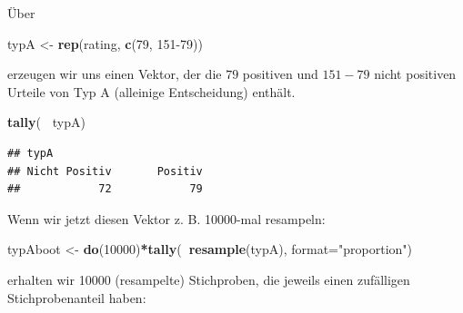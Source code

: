 \documentclass[12pt,ngerman,paper=a4,pagesize,DIV=13]{scrreprt}
\newenvironment{Shaded}{\begin{snugshade}}{\end{snugshade}}
\newcommand{\CommentTok}[1]{\textcolor[rgb]{0.56,0.35,0.01}{\textit{#1}}}
\newcommand{\DataTypeTok}[1]{\textcolor[rgb]{0.13,0.29,0.53}{#1}}
\newcommand{\DecValTok}[1]{\textcolor[rgb]{0.00,0.00,0.81}{#1}}
\newcommand{\KeywordTok}[1]{\textcolor[rgb]{0.13,0.29,0.53}{\textbf{#1}}}
\newcommand{\NormalTok}[1]{#1}
\newcommand{\OperatorTok}[1]{\textcolor[rgb]{0.81,0.36,0.00}{\textbf{#1}}}
\newcommand{\StringTok}[1]{\textcolor[rgb]{0.31,0.60,0.02}{#1}}
\begin{document}
Über

\begin{Shaded}
\begin{Highlighting}[]
\NormalTok{typA <-}\StringTok{ }\KeywordTok{rep}\NormalTok{(rating, }\KeywordTok{c}\NormalTok{(}\DecValTok{79}\NormalTok{, }\DecValTok{151-79}\NormalTok{))}
\end{Highlighting}
\end{Shaded}

erzeugen wir uns einen Vektor, der die \(79\) positiven und \(151-79\)
nicht positiven Urteile von Typ A (alleinige Entscheidung) enthält.

\begin{Shaded}
\begin{Highlighting}[]
\KeywordTok{tally}\NormalTok{(}\OperatorTok{~}\StringTok{ }\NormalTok{typA)}
\end{Highlighting}
\end{Shaded}

\begin{verbatim}
## typA
## Nicht Positiv       Positiv 
##            72            79
\end{verbatim}

Wenn wir jetzt diesen Vektor z. B. 10000-mal resampeln:

\begin{Shaded}
\begin{Highlighting}[]
\NormalTok{typAboot <-}\StringTok{ }\KeywordTok{do}\NormalTok{(}\DecValTok{10000}\NormalTok{)}\OperatorTok{*}\KeywordTok{tally}\NormalTok{(}\OperatorTok{~}\KeywordTok{resample}\NormalTok{(typA), }\DataTypeTok{format=}\StringTok{"proportion"}\NormalTok{)}
\end{Highlighting}
\end{Shaded}

erhalten wir 10000 (resampelte) Stichproben, die jeweils einen
zufälligen Stichprobenanteil haben:

\begin{Shaded}
\end{Shaded}
\end{document}
